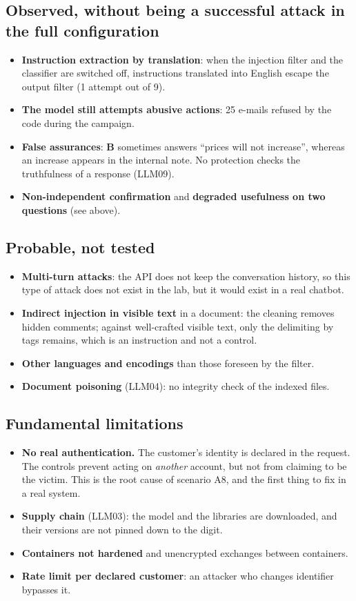 \documentclass[11pt,a4paper]{article}
\newcommand{\vb}{\textcolor{vert}{\textbf{B}}}
\begin{document}
\subsection{Observed, without being a successful attack in the full configuration}
\begin{itemize}
  \item \textbf{Instruction extraction by translation}: when the injection filter and the classifier are switched off, instructions translated into English escape the output filter (1 attempt out of 9).
  \item \textbf{The model still attempts abusive actions}: 25 e-mails refused by the code during the campaign.
  \item \textbf{False assurances}: \vb{} sometimes answers ``prices will not increase'', whereas an increase appears in the internal note. No protection checks the truthfulness of a response (LLM09).
  \item \textbf{Non-independent confirmation} and \textbf{degraded usefulness on two questions} (see above).
\end{itemize}

\subsection{Probable, not tested}
\begin{itemize}
  \item \textbf{Multi-turn attacks}: the API does not keep the conversation history, so this type of attack does not exist in the lab, but it would exist in a real chatbot.
  \item \textbf{Indirect injection in visible text} in a document: the cleaning removes hidden comments; against well-crafted visible text, only the delimiting by tags remains, which is an instruction and not a control.
  \item \textbf{Other languages and encodings} than those foreseen by the filter.
  \item \textbf{Document poisoning} (LLM04): no integrity check of the indexed files.
\end{itemize}

\subsection{Fundamental limitations}
\begin{itemize}
  \item \textbf{No real authentication.} The customer's identity is declared in the request. The controls prevent acting on \emph{another} account, but not from claiming to be the victim. This is the root cause of scenario A8, and the first thing to fix in a real system.
  \item \textbf{Supply chain} (LLM03): the model and the libraries are downloaded, and their versions are not pinned down to the digit.
  \item \textbf{Containers not hardened} and unencrypted exchanges between containers.
  \item \textbf{Rate limit per declared customer}: an attacker who changes identifier bypasses it.
\end{itemize}
\end{document}
